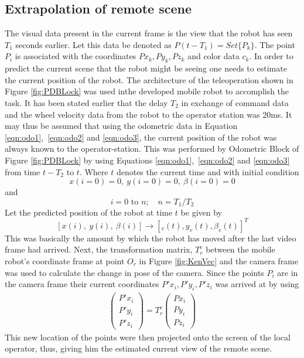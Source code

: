 \subsection{Extrapolation of remote scene } 
The visual data present in the current frame is the view that the robot has seen $T_1$ seconds earlier. Let this data be denoted as $P(t-T_1)=Set\{P_k\}$. The point $P_i$ is associated with the coordinates ${Px_k,Py_k,Pz_k}$ and color data $c_k$. In order to predict the current scene that the robot might be seeing one needs to estimate the current position of the robot. The  architecture of the teleoperation shown in Figure \ref{fig:PDBLock} was used inthe developed mobile robot to accomplish the task.
 It has been stated earlier that the delay $T_2$ in exchange of command data and the wheel velocity data from the robot to the operator station was 20ms. It may thus be assumed that  using the odometric data in Equation \ref{eqn:odo1},~\ref{eqn:odo2} and \ref{eqn:odo3}, the current position of the robot was always known to the operator-station. This was performed by Odometric Block of Figure \ref{fig:PDBLock} by using Equations \ref{eqn:odo1},~\ref{eqn:odo2} and \ref{eqn:odo3} from time $t-T_2$ to $t$. Where $t$ denotes the current time and  with initial condition \[x(i=0)=0,~y(i=0)=0 ,~ \beta(i=0)=0\] and  \[ i=0 \text{ to } n;  \quad n=T_1/T_2\] 
 Let the predicted position of the robot at time $t$ be given by 
\[[x(i),~y(i) ,~ \beta(i)]\rightarrow [_v(t),y_v(t),\beta_v(t)]^T\]
This was basically the amount by which the robot has moved after the last video frame had arrived. Next, the transformation matrix, $T^c_r$ between the mobile robot's coordinate frame at point $O_r$ in Figure \ref{fig:KenVec} and the camera frame was used to calculate the change in pose of the camera. Since the points $P_i$ are in the camera frame their current coordinates ${P'x_i,P'y_i,P'z_i}$ was arrived at by using 
\begin{eqnarray}
\begin{pmatrix}
P'x_i \\ P'y_i \\P'z_i
\end{pmatrix}=T^c_r
\begin{pmatrix}
Px_i\\Py_i\\Pz_i
\end{pmatrix}
\end{eqnarray}
This new location of the points were then  projected onto the screen of the local operator, thus, giving him the estimated current view of the remote scene. 

